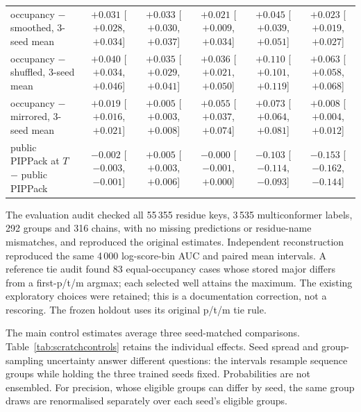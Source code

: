 \documentclass[10pt,a4paper]{article}
\begin{document}
\begin{table}[!htbp]
{\begin{tabular}{@{}lccccc@{}}
occupancy $-$ smoothed, 3-seed mean & $+0.031$ [$+0.028$, $+0.034$] & $+0.033$ [$+0.030$, $+0.037$] & $+0.021$ [$+0.009$, $+0.034$] & $+0.045$ [$+0.039$, $+0.051$] & $+0.023$ [$+0.019$, $+0.027$] \\
occupancy $-$ shuffled, 3-seed mean & $+0.040$ [$+0.034$, $+0.046$] & $+0.035$ [$+0.029$, $+0.041$] & $+0.036$ [$+0.021$, $+0.050$] & $+0.110$ [$+0.101$, $+0.119$] & $+0.063$ [$+0.058$, $+0.068$] \\
occupancy $-$ mirrored, 3-seed mean & $+0.019$ [$+0.016$, $+0.021$] & $+0.005$ [$+0.003$, $+0.008$] & $+0.055$ [$+0.037$, $+0.074$] & $+0.073$ [$+0.064$, $+0.081$] & $+0.008$ [$+0.004$, $+0.012$] \\
public PIPPack at $T$ $-$ public PIPPack & $-0.002$ [$-0.003$, $-0.001$] & $+0.005$ [$+0.003$, $+0.006$] & $-0.000$ [$-0.001$, $+0.000$] & $-0.103$ [$-0.114$, $-0.093$] & $-0.153$ [$-0.162$, $-0.144$] \\
\bottomrule
\end{tabular}}
\end{table}


The evaluation audit checked all 55\,355 residue keys, 3\,535 multiconformer labels, 292 groups and 316 chains, with no missing predictions or residue-name mismatches, and reproduced the original estimates. Independent reconstruction reproduced the same 4\,000 log-score-bin AUC and paired mean intervals. A reference tie audit found 83 equal-occupancy cases whose stored major differs from a first-p/t/m argmax; each selected well attains the maximum. The existing exploratory choices were retained; this is a documentation correction, not a rescoring. The frozen holdout uses its original p/t/m tie rule.

The main control estimates average three seed-matched comparisons. Table~\ref{tab:scratchcontrols} retains the individual effects. Seed spread and group-sampling uncertainty answer different questions: the intervals resample sequence groups while holding the three trained seeds fixed. Probabilities are not ensembled. For precision, whose eligible groups can differ by seed, the same group draws are renormalised separately over each seed's eligible groups.
\end{document}
